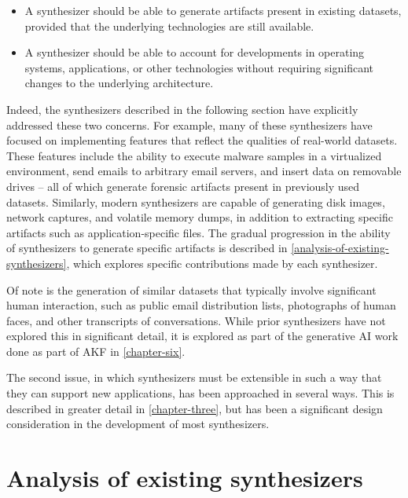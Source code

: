\documentclass[letterpaper,12pt]{report}
\def\tightlist{}
\begin{document}
\begin{itemize}
\tightlist
\item
  A synthesizer should be able to generate artifacts present in existing
  datasets, provided that the underlying technologies are still
  available.
\item
  A synthesizer should be able to account for developments in operating
  systems, applications, or other technologies without requiring
  significant changes to the underlying architecture.
\end{itemize}

Indeed, the synthesizers described in the following section have
explicitly addressed these two concerns. For example, many of these
synthesizers have focused on implementing features that reflect the
qualities of real-world datasets. These features include the ability to
execute malware samples in a virtualized environment, send emails to
arbitrary email servers, and insert data on removable drives -- all of
which generate forensic artifacts present in previously used datasets.
Similarly, modern synthesizers are capable of generating disk images,
network captures, and volatile memory dumps, in addition to extracting
specific artifacts such as application-specific files. The gradual
progression in the ability of synthesizers to generate specific
artifacts is described in \autoref{analysis-of-existing-synthesizers}, which explores specific
contributions made by each synthesizer.

Of note is the generation of similar datasets that typically involve
significant human interaction, such as public email distribution lists,
photographs of human faces, and other transcripts of conversations.
While prior synthesizers have not explored this in significant detail,
it is explored as part of the generative AI work done as part of AKF in
\autoref{chapter-six}.

The second issue, in which synthesizers must be extensible in such a way
that they can support new applications, has been approached in several
ways. This is described in greater detail in \autoref{chapter-three}, but has been a significant design consideration in the
development of most synthesizers.

\section{Analysis of existing
synthesizers}\label{analysis-of-existing-synthesizers}
\end{document}
